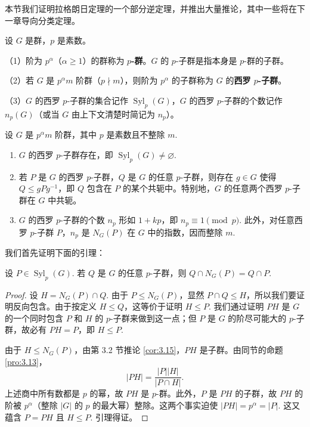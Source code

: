 本节我们证明拉格朗日定理的一个部分逆定理，并推出大量推论，其中一些将在下一章导向分类定理。

\begin{definition}
设 \(G\) 是群，\(p\) 是素数。

（1）阶为 \(p^\alpha\)（\(\alpha \geq 1\)）的群称为 \textbf{\(p\)-群}。\(G\) 的 \(p\)-子群是指本身是 \(p\)-群的子群。

（2）若 \(G\) 是 \(p^\alpha m\) 阶群（\(p \nmid m\)），则阶为 \(p^\alpha\) 的子群称为 \(G\) 的\textbf{西罗 \(p\)-子群}。

（3）\(G\) 的西罗 \(p\)-子群的集合记作 \(\operatorname{Syl}_p(G)\)，\(G\) 的西罗 \(p\)-子群的个数记作 \(n_p(G)\)（或当 \(G\) 由上下文清楚时简记为 \(n_p\)）。
\end{definition}

\begin{theorem}[西罗定理]\label{thm:4.18}
设 \(G\) 是 \(p^\alpha m\) 阶群，其中 \(p\) 是素数且不整除 \(m\).

\begin{enumerate}[label=(\arabic*)]
\item \(G\) 的西罗 \(p\)-子群存在，即 \(\operatorname{Syl}_p(G) \neq \varnothing\).

\item 若 \(P\) 是 \(G\) 的西罗 \(p\)-子群，\(Q\) 是 \(G\) 的任意 \(p\)-子群，则存在 \(g \in G\) 使得 \(Q \leq gPg^{-1}\)，即 \(Q\) 包含在 \(P\) 的某个共轭中。特别地，\(G\) 的任意两个西罗 \(p\)-子群在 \(G\) 中共轭。

\item \(G\) 的西罗 \(p\)-子群的个数 \(n_p\) 形如 \(1 + kp\)，即 \(n_p \equiv 1 \pmod{p}\). 此外，对任意西罗 \(p\)-子群 \(P\)，\(n_p\) 是 \(N_G(P)\) 在 \(G\) 中的指数，因而整除 \(m\).
\end{enumerate}
\end{theorem}

我们首先证明下面的引理：

\begin{lemma}\label{lem:4.19}
设 \(P \in \operatorname{Syl}_p(G)\). 若 \(Q\) 是 \(G\) 的任意 \(p\)-子群，则 \(Q \cap N_G(P) = Q \cap P\).
\end{lemma}

\begin{proof}
设 \(H = N_G(P) \cap Q\). 由于 \(P \leq N_G(P)\)，显然 \(P \cap Q \leq H\)，所以我们要证明反向包含。由于按定义 \(H \leq Q\)，这等价于证明 \(H \leq P\). 我们通过证明 \(PH\) 是 \(G\) 的一个同时包含 \(P\) 和 \(H\) 的 \(p\)-子群来做到这一点；但 \(P\) 是 \(G\) 的阶尽可能大的 \(p\)-子群，故必有 \(PH = P\)，即 \(H \leq P\).

由于 \(H \leq N_G(P)\)，由第 3.2 节推论 \ref{cor:3.15}，\(PH\) 是子群。由同节的命题 \ref{pro:3.13}，
\[
|PH| = \frac{|P||H|}{|P \cap H|}.
\]
上述商中所有数都是 \(p\) 的幂，故 \(PH\) 是 \(p\)-群。此外，\(P\) 是 \(PH\) 的子群，故 \(PH\) 的阶被 \(p^\alpha\)（整除 \(|G|\) 的 \(p\) 的最大幂）整除。这两个事实迫使 \(|PH| = p^\alpha = |P|\). 这又蕴含 \(P = PH\) 且 \(H \leq P\). 引理得证。
\end{proof}

